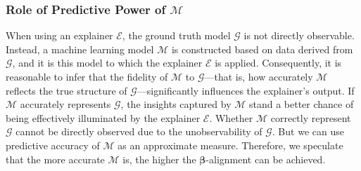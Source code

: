 \documentclass[mnsc,blindrev]{informs3}
\begin{document}
 

    
        

       


    \subsubsection{Role of Predictive Power of $\mathcal{M}$}
        \label{sec:role_of_predictive_power}
           When using an explainer $\mathcal{E}$, the ground truth model $\mathcal{G}$ is not directly observable. Instead, a machine learning model $\mathcal{M}$ is constructed based on data derived from $\mathcal{G}$, and it is this model to which the explainer $\mathcal{E}$ is applied. Consequently, it is reasonable to infer that the fidelity of $\mathcal{M}$ to $\mathcal{G}$—that is, how accurately $\mathcal{M}$ reflects the true structure of $\mathcal{G}$—significantly influences the explainer's output. If $\mathcal{M}$ accurately represents $\mathcal{G}$, the insights captured by $\mathcal{M}$ stand a better chance of being effectively illuminated by the explainer $\mathcal{E}$. Whether $\mathcal{M}$ correctly represent $\mathcal{G}$ cannot be directly observed due to the unobservability of $\mathcal{G}$. But we can use predictive accuracy of $\mathcal{M}$ as an approximate measure. Therefore, we speculate that the more accurate $\mathcal{M}$ is, the higher the $\boldsymbol{\beta}$-alignment can be achieved. 
\end{document}
